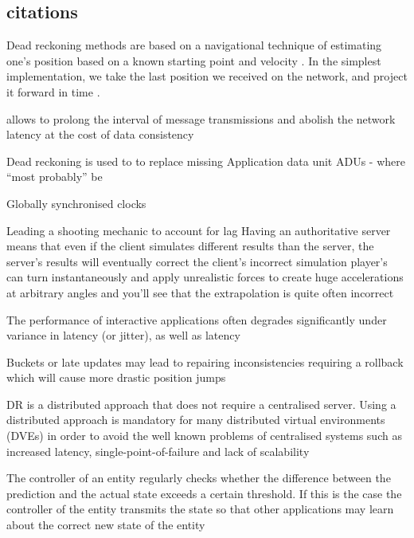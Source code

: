 \documentclass[journal]{IEEEtran}
\begin{document}
\subsection{citations}

Dead reckoning methods are based on a navigational technique of estimating one’s position based on a known starting point and velocity \cite{smed2002aspects}. In the simplest implementation, we take the last position we received on the network, and project it forward in time \cite{murphy2011believable}.

allows to prolong the interval of message transmissions and abolish the network latency at the cost of data consistency \cite{smed2002aspects}

Dead reckoning is used to to replace missing Application data unit ADUs \cite{diot1999distributed} - where ``most probably'' be


Globally synchronised clocks \cite{aggarwal2004accuracy}

Leading a shooting mechanic to account for lag \cite{bernier2001latency}
Having an authoritative server means that even if the client simulates different
results than the server, the server’s results will eventually correct the client’s incorrect
simulation \cite{bernier2001latency}
player’s can turn instantaneously and apply unrealistic forces to create huge accelerations at arbitrary angles and you’ll see that the extrapolation is quite often incorrect \cite{bernier2001latency}

The performance of interactive applications often degrades significantly under variance in latency (or jitter), as well as latency \cite{beigbeder2004effects}

Buckets or late updates may lead to repairing inconsistencies requiring a rollback which will cause more drastic position jumps \cite{cronin2002efficient}

DR is a distributed approach that does not require a centralised server. Using a distributed approach is mandatory for many distributed virtual environments (DVEs) in order to avoid the well known problems of centralised systems such as increased latency, single-point-of-failure and lack of scalability \cite{mauve2000keep}

The controller of an entity regularly checks whether the difference between the prediction and the actual state exceeds a certain threshold. If this is the case the controller of the entity transmits the state so that other applications may learn about the correct new state of the entity \cite{mauve2000keep}
\end{document}
